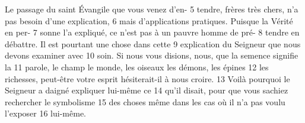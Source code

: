 Le passage du saint Évangile que vous venez d'en-	 
5	 	tendre, frères très chers, n'a pas besoin d'une explication,	 
6	 	mais d'applications pratiques. Puisque la Vérité en per-	 
7	 	sonne l'a expliqué, ce n'est pas à un pauvre homme de pré-	 
8	 	tendre en débattre. Il est pourtant une chose dans cette	 
9	 	explication du Seigneur que nous devons examiner avec	 
10	 	soin. Si nous vous disions, nous, que la semence signifie la	 
11	 	parole, le champ le monde, les oiseaux les démons, les épines	 
12	 	les richesses, peut-être votre esprit hésiterait-il à nous croire.	 
13	 	Voilà pourquoi le Seigneur a daigné expliquer lui-même ce	 
14	 	qu'il disait, pour que vous sachiez rechercher le symbolisme	 
15	 	des choses même dans les cas où il n'a pas voulu l'exposer	 
16	 	lui-même.